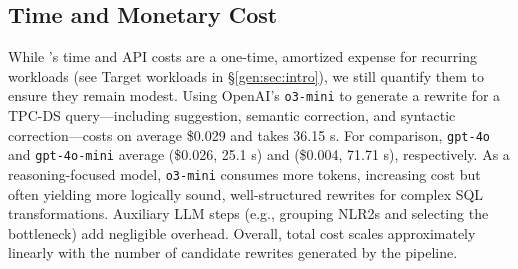 \subsection{Time and Monetary Cost}
\label{gen:sec:expr:llmcost}


While \genrewrite’s time and API costs are a one-time, amortized expense for recurring workloads (see Target workloads in \S\ref{gen:sec:intro}), we still quantify them to ensure they remain modest. Using OpenAI’s \texttt{o3-mini} to generate a rewrite for a TPC-DS query—including suggestion, semantic correction, and syntactic correction—costs on average \$0.029 and takes 36.15 s. For comparison, \texttt{gpt-4o} and \texttt{gpt-4o-mini} average (\$0.026, 25.1 s) and (\$0.004, 71.71 s), respectively. As a reasoning-focused model, \texttt{o3-mini} consumes more tokens, increasing cost but often yielding more logically sound, well-structured rewrites for complex SQL transformations. Auxiliary LLM steps (e.g., grouping NLR2s and selecting the bottleneck) add negligible overhead. Overall, total cost scales approximately linearly with the number of candidate rewrites generated by the pipeline.




